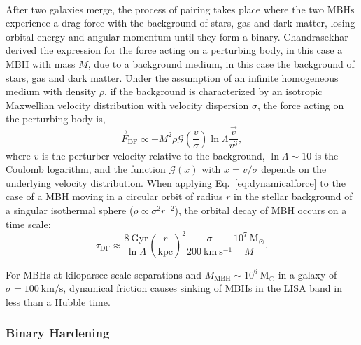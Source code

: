 \documentclass[a4paper,12pt]{article}
\begin{document}
\paragraph{}
After two galaxies merge, the process of pairing takes place where the two MBHs experience a drag force with the background of stars, gas and dark matter, losing orbital energy and angular momentum until they form a binary. Chandrasekhar \cite{chandrasekhar1943dynamical} derived the expression for the force acting on a perturbing body, in this case a MBH with mass $M$, due to a background medium, in this case the background of stars, gas and dark matter. Under the assumption of an infinite homogeneous medium with density $\rho$, if the background is characterized by an isotropic Maxwellian velocity distribution with velocity dispersion $\sigma$, the force acting on the perturbing body is,
\begin{equation}
\Vec{F}_{\mathrm{DF}} \propto -M^{2}\rho\mathcal{G}\left(\frac{v}{\sigma}\right)\ln\Lambda\frac{\Vec{v}}{v^{3}},
\label{eq:dynamicalforce}
\end{equation}
where $v$ is the perturber velocity relative to the background, $\ln\Lambda\sim10$ is the Coulomb logarithm, and the function $\mathcal{G}(x)$ with $x = v/\sigma$ depends on the underlying velocity distribution. When applying Eq.~\eqref{eq:dynamicalforce} to the case of a MBH moving in a circular orbit of radius $r$ in the stellar background of a singular isothermal sphere ($\rho \propto \sigma^{2} r^{-2}$), the orbital decay of MBH occurs on a time scale:
\begin{equation}
\tau_{\mathrm{DF}} \approx \frac{8~\mathrm{Gyr}}{\ln\Lambda} \left(\frac{r}{\mathrm{kpc}} \right)^{2} \frac{\sigma}{200~\mathrm{km~s^{-1}}} \frac{10^7~\mathrm{M}_{\odot}}{M}.
\label{eq:dynamicaltimescale}
\end{equation}

For MBHs at kiloparsec scale separations and $M_{\mathrm{MBH}} \sim 10^{6}~\mathrm{M}_{\odot}$ in a galaxy of $\sigma=100~\mathrm{km/s}$, dynamical friction causes sinking of MBHs in the LISA band in less than a Hubble time.

\subsubsection{Binary Hardening}
\end{document}
